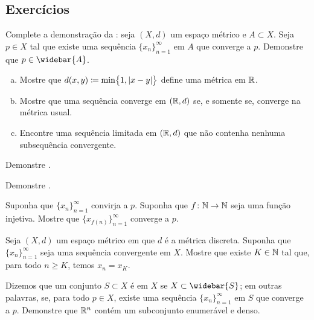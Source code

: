 \subsection{Exercícios}

\begin{exercise} \label{exercise:reverseclosedseq}
Complete a demonstração da 
:
seja $(X,d)$ um espaço métrico e
$A \subset X$. Seja $p \in X$ tal
que existe uma sequência $\{ x_n \}_{n=1}^\infty$ em $A$ que converge a $p$.
Demonstre que $p \in \widebar{A}$.
\end{exercise}

\begin{exercise}
\leavevmode
\begin{enumerate}[a)]
\item
Mostre que $d(x,y) \coloneqq \min \bigl\{ 1, \lvert {x-y} \rvert \bigr\}$ define uma
métrica em ${\mathbb{R}}$.
\item
Mostre que uma sequência converge em $({\mathbb{R}},d)$ se, e somente se, converge
na métrica usual.
\item
Encontre uma sequência limitada em $({\mathbb{R}},d)$ que
não contenha nenhuma subsequência convergente.
\end{enumerate}
\end{exercise}

\begin{exercise}
Demonstre .
\end{exercise}

\begin{exercise}
Demonstre .
\end{exercise}

\begin{exercise}
Suponha que $\{x_n\}_{n=1}^\infty$ convirja a $p$. Suponha que
$f \colon {\mathbb{N}} \to {\mathbb{N}}$ seja uma função injetiva. Mostre que
$\{ x_{f(n)} \}_{n=1}^\infty$ converge a $p$.
\end{exercise}

\begin{exercise}
Seja $(X,d)$ um espaço métrico em que $d$ é a métrica discreta. Suponha que
$\{ x_n \}_{n=1}^\infty$ seja uma sequência convergente em $X$. Mostre que
existe $K \in {\mathbb{N}}$ tal que, para todo $n \geq K$, temos $x_n = x_K$.
\end{exercise}

\begin{exercise}
Dizemos que um conjunto $S \subset X$ é \emph{} em $X$ se
$X \subset \widebar{S}$; em outras palavras, se, para todo $p \in X$,
existe uma sequência $\{ x_n \}_{n=1}^\infty$ em $S$ que converge a $p$.
Demonstre que ${\mathbb{R}}^n$ contém um subconjunto enumerável e denso.
\end{exercise}

